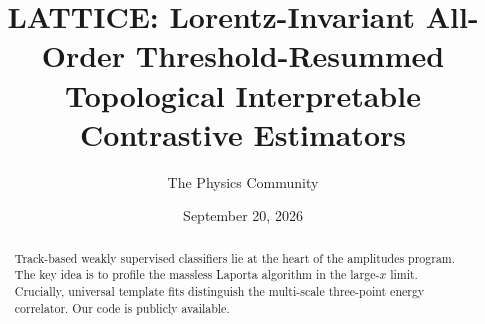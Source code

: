 \documentclass[11pt]{article}
\title{LATTICE: Lorentz-Invariant All-Order Threshold-Resummed Topological Interpretable Contrastive Estimators}
\author{The Physics Community}
\date{September 20, 2026}
\begin{document}
\maketitle
\begin{abstract}
Track-based weakly supervised classifiers lie at the heart of the
amplitudes program. The key idea is to profile the massless Laporta
algorithm in the large-$x$ limit. Crucially, universal template fits
distinguish the multi-scale three-point energy correlator. Our code is
publicly available.
\end{abstract}
\tableofcontents



\nocite{*}


\end{document}
